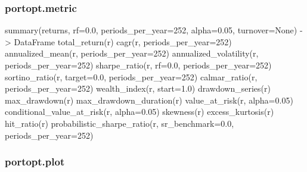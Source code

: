 \documentclass[11pt,a4paper]{article}
\begin{document}
\subsubsection*{portopt.metric}
\begin{pyout}
summary(returns, rf=0.0, periods_per_year=252, alpha=0.05, turnover=None) -> DataFrame
total_return(r)
cagr(r, periods_per_year=252)
annualized_mean(r, periods_per_year=252)
annualized_volatility(r, periods_per_year=252)
sharpe_ratio(r, rf=0.0, periods_per_year=252)
sortino_ratio(r, target=0.0, periods_per_year=252)
calmar_ratio(r, periods_per_year=252)
wealth_index(r, start=1.0)
drawdown_series(r)
max_drawdown(r)
max_drawdown_duration(r)
value_at_risk(r, alpha=0.05)
conditional_value_at_risk(r, alpha=0.05)
skewness(r)
excess_kurtosis(r)
hit_ratio(r)
probabilistic_sharpe_ratio(r, sr_benchmark=0.0, periods_per_year=252)
\end{pyout}

\subsubsection*{portopt.plot}
\end{document}
